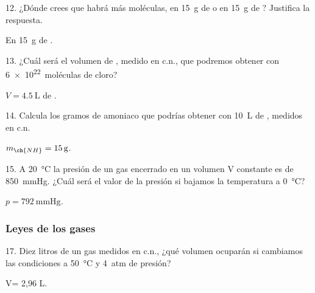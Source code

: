 \documentclass[10pt]{article}
\begin{document}
\begin{multicols}{2}
\begin{exercise}
  12. ¿Dónde crees que habrá más moléculas, en \SI{15}{g} de  o en
  \SI{15}{g} de ? Justifica la respuesta.
\end{exercise}
\begin{solution}
  En \SI{15}{g} de .
\end{solution}

\begin{exercise}
  13. ¿Cuál será el volumen de , medido en c.n., que podremos
  obtener con \SI{6e22}{moléculas} de cloro?
\end{exercise}
\begin{solution}
  $V = \SI{4.5}{\liter}$ de .
\end{solution}

\begin{exercise}
  14. Calcula los gramos de amoniaco que podrías obtener con \SI{10}{\liter}
  de , medidos en c.n.
\end{exercise}
\begin{solution}
  $m_{\ch{NH}} = \SI{15}{g}$.
\end{solution}

\begin{exercise}
  15. A \SI{20}{\celsius} la presión de un gas encerrado en un volumen V constante es de \SI{850}{\mmHg}. ¿Cuál será el valor de la presión si bajamos la temperatura a \SI{0}{\celsius}?
\end{exercise}
\begin{solution}
  $p = \SI{792}{\mmHg}$.
\end{solution}



\subsubsection{Leyes de los gases}

\begin{exercise}
  17. Diez litros de un gas medidos en c.n., ¿qué volumen ocuparán
  si cambiamos las condiciones a \SI{50}{\celsius} y \SI{4}{atm} de presión?
\end{exercise}
\begin{solution}
  V= 2,96 L.
\end{solution}


\end{multicols}
\end{document}
